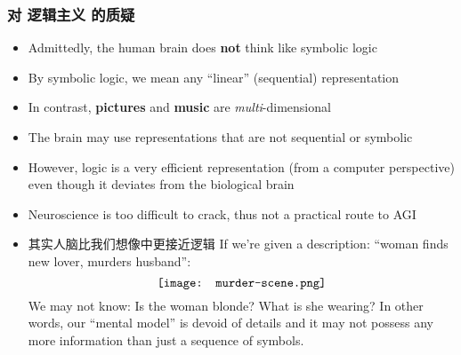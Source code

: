 \documentclass[16pt]{beamer}
\newcommand{\cc}[2]{#1}
\newcommand{\cc}[2]{#2}
\begin{document}
\begin{frame}
\frametitle{\cc{对 逻辑主义 的质疑}{Doubts about logicism}}
\begin{itemize}
	\item Admittedly, the human brain does \textbf{not} think like symbolic logic
	\item By symbolic logic, we mean any ``linear'' (sequential) representation
	\item In contrast, \textbf{pictures} and \textbf{music} are \textit{multi}-dimensional
	\item The brain may use representations that are not sequential or symbolic
	\item However, logic is a very efficient representation (from a computer perspective) even though it deviates from the biological brain
	\item Neuroscience is too difficult to crack, thus not a practical route to AGI
	\item \cc{其实人脑比我们想像中更接近逻辑}{
	Human cognition may be much closer to logic than we've thought.}
	If we're given a description:  ``woman finds new lover, murders husband'':
	\begin{equation}
	\vcenter{\hbox{\texttt{[image: murder-scene.png]}}}
	\end{equation}
	We may not know:  Is the woman blonde? What is she wearing?
	In other words, our ``mental model'' is devoid of details and it may not possess any more information than just a sequence of symbols.
\end{itemize}
\end{frame}
\end{document}
